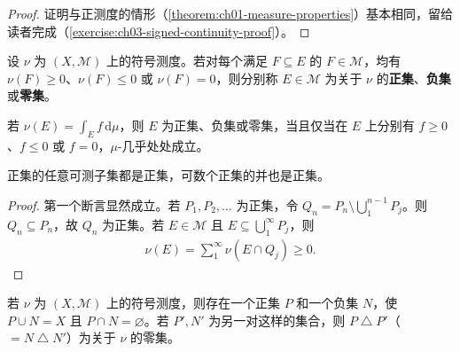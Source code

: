 \documentclass[../../main.tex]{subfiles}%
\begin{document}
\begin{proof}
证明与正测度的情形（\cref{theorem:ch01-measure-properties}）基本相同，留给读者完成（\cref{exercise:ch03-signed-continuity-proof}）。
\end{proof}
\begin{definition}[正集、负集与零集]\label{definition:ch03-sign-sets}
设 $\nu$ 为 $(X,\mathscr{M})$ 上的符号测度。若对每个满足 $F\subseteq E$ 的 $F\in\mathscr{M}$，均有 $\nu(F)\ge0$、$\nu(F)\le0$ 或 $\nu(F)=0$，则分别称 $E\in\mathscr{M}$ 为关于 $\nu$ 的\textbf{正集}、\textbf{负集}或\textbf{零集}。
\end{definition}
\begin{example}\label{example:ch03-sign-sets-density}
若 $\nu(E)=\int_E f\,\mathrm{d}\mu$，则 $E$ 为正集、负集或零集，当且仅当在 $E$ 上分别有 $f\ge0$、$f\le0$ 或 $f=0$，$\mu$-几乎处处成立。
\end{example}
\begin{lemma}\label{lemma:ch03-positive-union}
正集的任意可测子集都是正集，可数个正集的并也是正集。
\end{lemma}
\begin{proof}
第一个断言显然成立。若 $P_1,P_2,\ldots$ 为正集，令 $Q_n=P_n\setminus\bigcup_1^{n-1}P_j$。则 $Q_n\subseteq P_n$，故 $Q_n$ 为正集。若 $E\in\mathscr{M}$ 且 $E\subseteq\bigcup_1^\infty P_j$，则
\begin{align*}
\nu(E)=\sum_1^\infty\nu(E\cap Q_j)\ge0.
\end{align*}
\end{proof}
\begin{theorem}\label{theorem:ch03-hahn-decomposition}
若 $\nu$ 为 $(X,\mathscr{M})$ 上的符号测度，则存在一个正集 $P$ 和一个负集 $N$，使 $P\cup N=X$ 且 $P\cap N=\varnothing$。若 $P',N'$ 为另一对这样的集合，则 $P\mathbin{\triangle}P'$（$=N\mathbin{\triangle}N'$）为关于 $\nu$ 的零集。
\end{theorem}
\end{document}
